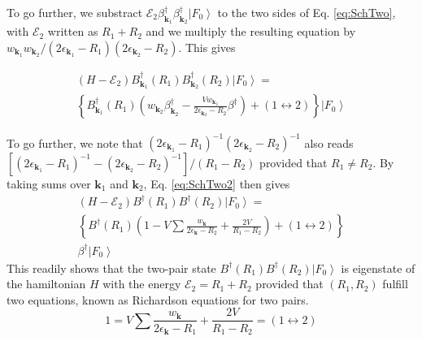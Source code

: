\documentclass[aps,prb,amsmath,amssymb,superscriptaddress,twocolumn]{revtex4-1}
\newcommand{\vk}{\ensuremath{\mathbf{k}}}
\newcommand{\E}{\ensuremath{\mathbf{E}}}
\newcommand{\ket}[1]{\ensuremath{\left|#1\right>}}
\newcommand{\br}[1]{\ensuremath{\left(#1\right)}}
\newcommand{\mbr}[1]{\ensuremath{\left[#1\right]}}
\newcommand{\bbr}[1]{\ensuremath{\left\{#1\right\}}}
\newcommand{\fo}{\ensuremath{\ket{F_0}}}
\renewcommand{\E}{\ensuremath{\mathcal{E}}}
\begin{document}
To go further, we substract $\E_2\beta^{\dagger}_{\vk_1}\beta^{\dagger}_{\vk_2}\fo$ to the two sides of Eq. \eqref{eq:SchTwo}, with $\E_2$ written as $R_1+R_2$ and we multiply the resulting equation by 
$w_{\vk_1}w_{\vk_2}/\br{2\epsilon_{\vk_1}-R_1}\br{2\epsilon_{\vk_2}-R_2}$. This gives 

\begin{multline}\label{eq:SchTwo2}
(H-\E_2)B^{\dagger}_{\vk_1}(R_1)B^{\dagger}_{\vk_2}(R_2)\fo
=\\
\bbr{B^{\dagger}_{\vk_1}(R_1)\br{w_{\vk_2}\beta^{\dagger}_{\vk_2}-\frac{Vw_{\vk_2}}{2\epsilon_{\vk_2}-R_2}\beta^{\dagger}}
+(1\leftrightarrow2)}\fo
\end{multline}

To go further, we note that $\br{2\epsilon_{\vk_1}-R_1}^{-1}\br{2\epsilon_{\vk_2}-R_2}^{-1}$ also reads  $\mbr{\br{2\epsilon_{\vk_1}-R_1}^{-1}-\br{2\epsilon_{\vk_2}-R_2}^{-1}}/\br{R_1-R_2}$ provided that $R_1\neq{}R_2$. By taking sums over $\vk_1$ and $\vk_2$, Eq. \eqref{eq:SchTwo2} then gives
\begin{multline}\label{eq:SchTwo3}
(H-\E_2)B^{\dagger}(R_1)B^{\dagger}(R_2)\fo
=\\
\bbr{B^{\dagger}(R_1)\br{1-V\sum\frac{w_{\vk}}{2\epsilon_{\vk}-R_2}+\frac{2V}{R_1-R_2}}+(1\leftrightarrow2)}\\
\beta^{\dagger}\fo
\end{multline}
This readily shows that the two-pair state $B^{\dagger}(R_1)B^{\dagger}(R_2)\fo$ is eigenstate of the hamiltonian $H$ with the energy $\E_2=R_1+R_2$ provided that $\br{R_1,R_2}$ fulfill two equations, known as Richardson equations for two pairs.
\begin{equation}
1=V\sum\frac{w_{\vk}}{2\epsilon_{\vk}-R_1}+\frac{2V}{R_1-R_2}=(1\leftrightarrow2)
\end{equation}
\end{document}
